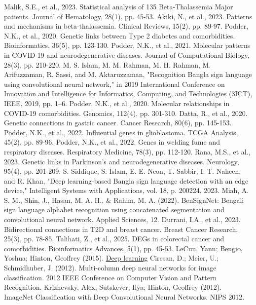 \documentclass[a4paper,12pt,openbib,oneside]{memoir}
\theoremstyle{plain}
\theoremstyle{plain}
\theoremstyle{plain}
\theoremstyle{definition}
\theoremstyle{plain}
\theoremstyle{plain}
\theoremstyle{plain}
\begin{document}
\begin{thebibliography}{99}
 Malik, S.E., et al., 2023. Statistical analysis of 135 Beta-Thalassemia Major patients. Journal of Hematology, 28(1), pp. 45-53.
 Akiki, N., et al., 2023. Patterns and mechanisms in beta-thalassemia. Clinical Reviews, 15(2), pp. 89-97.
 Podder, N.K., et al., 2020. Genetic links between Type 2 diabetes and comorbidities. Bioinformatics, 36(5), pp. 123-130.
 Podder, N.K., et al., 2021. Molecular patterns in COVID-19 and neurodegenerative diseases. Journal of Computational Biology, 28(3), pp. 210-220.
 M. S. Islam, M. M. Rahman, M. H. Rahman, M. Arifuzzaman, R. Sassi, and M. Aktaruzzaman, "Recognition Bangla sign language using convolutional neural network," in 2019 International Conference on Innovation and Intelligence for Informatics, Computing, and Technologies (3ICT), IEEE, 2019, pp. 1–6.
 Podder, N.K., et al., 2020. Molecular relationships in COVID-19 comorbidities. Genomics, 112(4), pp. 301-310.
 Datta, R., et al., 2020. Genetic connections in gastric cancer. Cancer Research, 80(6), pp. 145-153.
 Podder, N.K., et al., 2022. Influential genes in glioblastoma. TCGA Analysis, 45(2), pp. 89-96.
 Podder, N.K., et al., 2022. Genes in welding fume and respiratory diseases. Respiratory Medicine, 78(3), pp. 112-120.
 Rana, M.S., et al., 2023. Genetic links in Parkinson’s and neurodegenerative diseases. Neurology, 95(4), pp. 201-209.
 S. Siddique, S. Islam, E. E. Neon, T. Sabbir, I. T. Naheen, and R. Khan, "Deep learning-based Bangla sign language detection with an edge device," Intelligent Systems with Applications, vol. 18, p. 200224, 2023.
 Miah, A. S. M., Shin, J., Hasan, M. A. H., \& Rahim, M. A. (2022). BenSignNet: Bengali sign language alphabet recognition using concatenated segmentation and convolutional neural network. Applied Sciences, 12.
 Durrani, I.A., et al., 2023. Bidirectional connections in T2D and breast cancer. Breast Cancer Research, 25(3), pp. 78-85.
 Talihati, Z., et al., 2025. DEGs in colorectal cancer and comorbidities. Bioinformatics Advances, 5(1), pp. 45-53.
 LeCun, Yann; Bengio, Yoshua; Hinton, Geoffrey (2015). \href{https://hal.science/hal-04206682/file/Lecun2015.pdf} {Deep learning}
 Ciresan, D.; Meier, U.; Schmidhuber, J. (2012). Multi-column deep neural networks for image classification. 2012 IEEE Conference on Computer Vision and Pattern Recognition.
 Krizhevsky, Alex; Sutskever, Ilya; Hinton, Geoffrey (2012). ImageNet Classification with Deep Convolutional Neural Networks. NIPS 2012.

\end{thebibliography}
\end{document}
